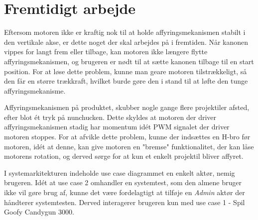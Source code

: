 \chapter{Fremtidigt arbejde}




Eftersom motoren ikke er kraftig nok til at holde affyringsmekanismen stabilt i den vertikale akse, er dette noget der skal arbejdes på i fremtiden. Når kanonen vippes for langt frem eller tilbage, kan motoren ikke længere flytte affyringsmekanismen, og brugeren er nødt til at sætte kanonen tilbage til en start position. For at løse dette problem, kunne man geare motoren tilstrækkeligt, så den får en større trækkraft, hvilket burde gøre den i stand til at løfte den tunge affyringsmekanisme. \newline

\noindent Affyringsmekanismen på produktet, skubber nogle gange flere projektiler afsted, efter blot ét tryk på nunchucken. Dette skyldes at motoren der driver affyringsmekanismen stadig har momentum idét PWM signalet der driver motoren stoppes. For at afvikle dette problem, kunne der indsættes en H-bro før motoren, idét at denne, kan give motoren en "bremse" funktionalitet, der kan låse motorens rotation, og derved sørge for at kun et enkelt projektil bliver affyret. \newline 

\noindent I systemarkitekturen indeholde use case diagrammet en enkelt aktør, nemig brugeren. Idét at use case 2 omhandler en systemtest, som den almene bruger ikke vil gøre brug af, kunne det være fordelagtigt at tilføje en \textit{Admin} aktør der håndterer systemtesten. Derved interagerer brugeren kun med use case 1 - Spil Goofy Candygun 3000. \newline

